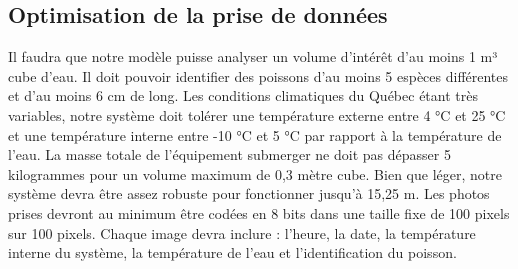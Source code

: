 

\subsection{Optimisation de la prise de données}
\label{s:beo_obj_optimdonn}

Il faudra que notre modèle puisse analyser un volume d’intérêt d’au moins 1 m³ cube d’eau.
Il doit pouvoir identifier des poissons d’au moins 5 espèces différentes et d’au moins 6 cm de long.
Les conditions climatiques du Québec étant très variables, notre système doit tolérer une température externe entre 4 °C et 25 °C et une température interne entre -10 °C et 5 °C par rapport à la température de l’eau.
La masse totale de l’équipement submerger ne doit pas dépasser 5 kilogrammes pour un volume maximum de 0,3 mètre cube. Bien que léger, notre système devra être assez robuste pour fonctionner jusqu’à 15,25 m.
Les photos prises devront au minimum être codées en 8 bits dans une taille fixe de 100 pixels sur 100 pixels.
Chaque image devra inclure : l’heure, la date, la température interne du système, la température de l’eau et l’identification du poisson.